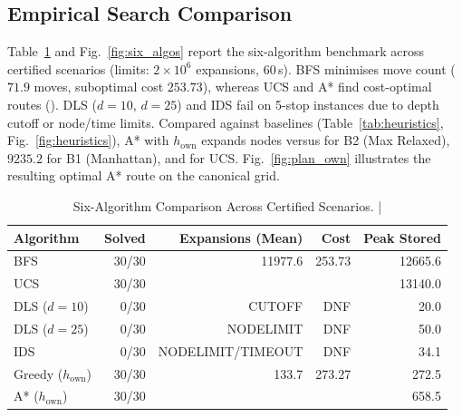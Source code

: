 \documentclass[conference]{IEEEtran}
\begin{document}
\subsection{Empirical Search Comparison}
Table~\ref{tab:six_algos} and Fig.~\ref{fig:six_algos} report the six-algorithm benchmark across \numPartbScenarios{} certified scenarios (limits: $2\times 10^6$ expansions, $60$\,s). BFS minimises move count ($71.9$ moves, suboptimal cost $253.73$), whereas UCS and A* find cost-optimal routes (\numPartbOwnMeanCost{}). DLS ($d=10$, $d=25$) and IDS fail on 5-stop instances due to depth cutoff or node/time limits. Compared against baselines (Table~\ref{tab:heuristics}, Fig.~\ref{fig:heuristics}), A* with $h_{\text{own}}$ expands \numPartbOwnMeanExp{} nodes versus \numPartbBTwoMeanExp{} for B2 (Max Relaxed), $9235.2$ for B1 (Manhattan), and \numPartbUcsMeanExp{} for UCS. Fig.~\ref{fig:plan_own} illustrates the resulting optimal A* route on the canonical grid.

\begin{table}[t]
    \centering
    \caption{Six-Algorithm Comparison Across \numPartbScenarios{} Certified Scenarios. | \stampline}
    \label{tab:six_algos}
    \scriptsize
    \begin{tabular}{@{}lrrrr@{}}
        \toprule
        Algorithm & Solved & Expansions (Mean) & Cost & Peak Stored \\
        \midrule
        BFS                 & 30/30 & 11977.6 & 253.73 & 12665.6 \\
        UCS                 & 30/30 & \numPartbUcsMeanExp{} & \numPartbOwnMeanCost{} & 13140.0 \\
        DLS ($d=10$)        & 0/30  & CUTOFF  & DNF    & 20.0 \\
        DLS ($d=25$)        & 0/30  & NODELIMIT & DNF  & 50.0 \\
        IDS                 & 0/30  & NODELIMIT/TIMEOUT & DNF & 34.1 \\
        Greedy ($h_{\text{own}}$) & 30/30 & 133.7 & 273.27 & 272.5 \\
        A* ($h_{\text{own}}$)     & 30/30 & \numPartbOwnMeanExp{} & \numPartbOwnMeanCost{} & 658.5 \\
        \bottomrule
    \end{tabular}
\end{table}
\end{document}

